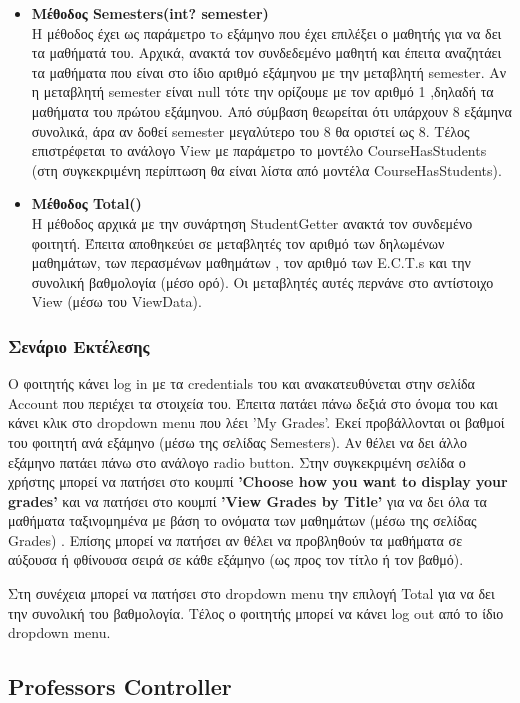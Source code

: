 \documentclass[12pt]{article}
\begin{document}
\begin{itemize}
	
	\item \textbf{Μέθοδος Semesters(int? semester)}\\
	Η μέθοδος έχει ως παράμετρο τo εξάμηνο που έχει επιλέξει ο μαθητής για να δει τα μαθήματά του. Αρχικά, ανακτά τον συνδεδεμένο μαθητή και έπειτα αναζητάει τα μαθήματα που είναι στο ίδιο αριθμό εξάμηνου με την μεταβλητή semester. Αν η μεταβλητή semester είναι null τότε την ορίζουμε με τον αριθμό 1 ,δηλαδή τα μαθήματα του πρώτου εξάμηνου. Από σύμβαση θεωρείται ότι υπάρχουν 8 εξάμηνα συνολικά, άρα αν δοθεί semester μεγαλύτερο του 8 θα οριστεί ως 8. Τέλος επιστρέφεται το ανάλογο View με παράμετρο το μοντέλο CourseHasStudents (στη συγκεκριμένη περίπτωση θα είναι λίστα από μοντέλα CourseHasStudents).
		
	\item \textbf{Μέθοδος Total()}\\
	Η μέθοδος αρχικά με την συνάρτηση StudentGetter ανακτά τον συνδεμένο φοιτητή. Έπειτα αποθηκεύει σε μεταβλητές τον αριθμό των δηλωμένων μαθημάτων, των περασμένων μαθημάτων , τον αριθμό των E.C.T.s και την συνολική βαθμολογία (μέσο ορό). Οι μεταβλητές αυτές περνάνε στο αντίστοιχο View (μέσω του ViewData).
	
\end{itemize}

\subsubsection{Σενάριο Εκτέλεσης}
Ο φοιτητής κάνει log in με τα credentials του και ανακατευθύνεται στην σελίδα Account που περιέχει τα στοιχεία του. Έπειτα πατάει πάνω δεξιά στο όνομα του και κάνει κλικ στο  dropdown menu που λέει 'My Grades'. Εκεί προβάλλονται οι βαθμοί του φοιτητή ανά εξάμηνο (μέσω της σελίδας Semesters).  Αν θέλει να δει άλλο εξάμηνο πατάει πάνω στο ανάλογο radio button. Στην συγκεκριμένη σελίδα ο χρήστης μπορεί να πατήσει στο κουμπί \textbf{'Choose how you want to display your grades'} και να πατήσει στο κουμπί \textbf{'View Grades by Title'} για να δει όλα τα μαθήματα ταξινομημένα με βάση το ονόματα των μαθημάτων (μέσω της σελίδας Grades) . Επίσης μπορεί να πατήσει αν θέλει να προβληθούν τα μαθήματα σε αύξουσα ή φθίνουσα σειρά σε κάθε εξάμηνο (ως προς τον τίτλο ή τον βαθμό). 

Στη συνέχεια μπορεί να πατήσει στο dropdown menu την επιλογή Total για να δει την συνολική του βαθμολογία. Τέλος ο φοιτητής μπορεί να κάνει log out από το ίδιο dropdown menu.
	
\subsection{Professors Controller}
\end{document}
